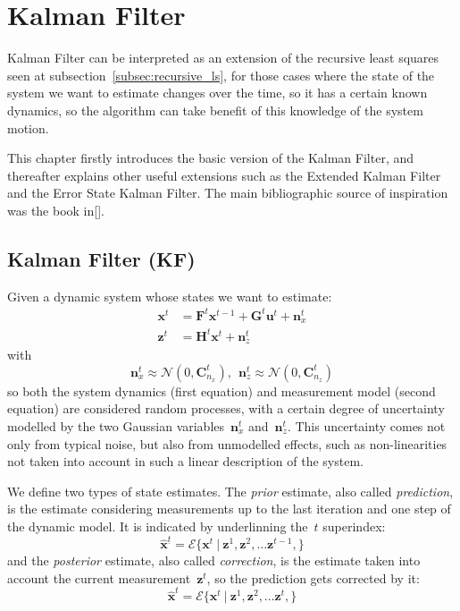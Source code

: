 \section{Kalman Filter}
\label{sec:KalmanFilter}
Kalman Filter can be interpreted as an extension of the recursive least squares seen at subsection~\ref{subsec:recursive_ls}, for those cases where the state of the system we want to estimate changes over the time, so it has a certain known dynamics, so the algorithm can take benefit of this knowledge of the system motion.

This chapter firstly introduces the basic version of the Kalman Filter, and thereafter explains other useful extensions such as the Extended Kalman Filter and the Error State Kalman Filter. The main bibliographic source of inspiration was the book in[].%

\subsection{Kalman Filter (KF)}
Given a dynamic system whose states we want to estimate:
\begin{align}
\mathbf{x}^t & = \mathbf{F}^t\mathbf{x}^{t-1} + \mathbf{G}^t\mathbf{u}^{t} + \mathbf{n}^t_x \label{eq:dynamic_system_1}\\
\mathbf{z}^t & = \mathbf{H}^t\mathbf{x}^t + \mathbf{n}^t_z \label{eq:dynamic_system_2}
\end{align} 
with 
\begin{equation}
 \mathbf{n}^t_x \approx \mathcal{N}(0,\mathbf{C}^t_{n_x}), \ \ \mathbf{n}^t_z \approx \mathcal{N}(0,\mathbf{C}^t_{n_z})
\end{equation}
so both the system dynamics (first equation) and measurement model (second equation) are considered random processes, with a certain degree of uncertainty modelled by the two Gaussian variables~$\mathbf{n}^t_x$ and~$\mathbf{n}^t_z$. This uncertainty comes not only from typical noise, but also from unmodelled effects, such as non-linearities not taken into account in such a linear description of the system. 

We define two types of state estimates. The \textit{prior} estimate, also called \textit{prediction}, is the estimate considering measurements up to the last iteration and one step of the dynamic model. It is indicated by underlinning the~$t$ superindex:
\begin{equation}
 \hat{\mathbf{x}}^{\underline{t}} = \mathcal{E}\{\mathbf{x}^t\ |\ \mathbf{z}^1,\mathbf{z}^2,\dots \mathbf{z}^{t-1},\}
\end{equation}
and the \textit{posterior} estimate, also called \textit{correction}, is the estimate taken into account the current measurement~$\mathbf{z}^{t}$, so the prediction gets corrected by it:
\begin{equation}
 \hat{\mathbf{x}}^{t} = \mathcal{E}\{\mathbf{x}^t\ |\ \mathbf{z}^1,\mathbf{z}^2,\dots \mathbf{z}^{t},\}
\end{equation}

